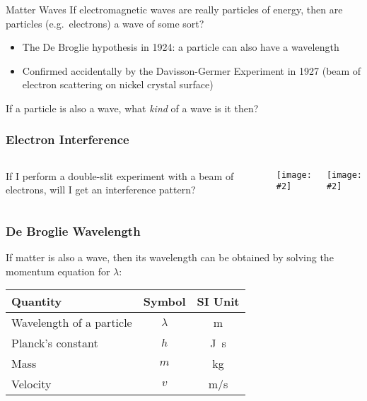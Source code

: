 \documentclass[12pt,compress,aspectratio=169]{beamer}
\newcommand{\pic}[2]{\texttt{[image: \#2]}}
\newcommand{\eq}[2]{\vspace{#1}{\Large\begin{displaymath}#2\end{displaymath}}}
\begin{document}
\begin{frame}{Matter Waves}
  If electromagnetic waves are really particles of energy, then are particles
  (e.g.\ electrons) a wave of some sort?
  \begin{itemize}
  \item The De Broglie hypothesis in 1924: a particle can also have a
    wavelength
  \item Confirmed accidentally by the Davisson-Germer Experiment in 1927 (beam
    of electron scattering on nickel crystal surface)
  \end{itemize}

  \vspace{.1in}If a particle is also a wave, what \emph{kind} of a wave is it
  then?
\end{frame}



\begin{frame}
  \frametitle{Electron Interference}
  \begin{columns}
    If I perform a double-slit experiment with a beam of electrons, will I get
    an interference pattern?
    \begin{center}
      \pic{.7}{CNX_Chem_06_03_Electrnin}
    \end{center}

    \pic{1}{206px-Double-slit_experiment_results_Tanamura_2.jpg}
  \end{columns}
\end{frame}



\begin{frame}
  \frametitle{De Broglie Wavelength}
  If matter is also a wave, then its wavelength can be obtained by solving the
  momentum equation for $\lambda$:

  \eq{-.2in}{
    p=\frac{h}{\lambda}\;\;\rightarrow\;\;
    \lambda=\frac{h}{p}\;\;\rightarrow\;\;\boxed{\lambda=\frac{h}{mv}}
  }

  \vspace{-.1in}
  \begin{center}
    \begin{tabular}{l|c|c}
      \rowcolor{pink}
      \textbf{Quantity} & \textbf{Symbol} & \textbf{SI Unit} \\ \hline
      Wavelength of a particle & $\lambda$ & \si{\metre} \\
      Planck's constant & $h$  & \si{\joule.\second} \\
      Mass              & $m$  & \si{\kilo\gram} \\
      Velocity          & $v$  & \si{\metre/\second}
    \end{tabular}
  \end{center}
\end{frame}
\end{document}
